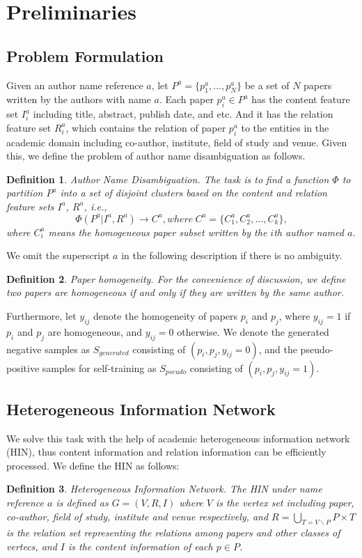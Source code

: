 \documentclass[letterpaper]{article} %
\newtheorem{mydef}{Definition}
\begin{document}
\section{Preliminaries}

\subsection{Problem Formulation}
Given an author name reference $a$, let $P^a =\{p^a_1, \dots, p^a_N\}$ be a set of $N$ papers written by the authors with name $a$.
Each paper $p_i^a \in P^a$ has the content feature set $I_i^a$ including title, abstract, publish date, and etc.
And it has the relation feature set $R_i^a$, which contains the relation of paper $p^a_i$ to the entities in the academic domain including co-author, institute, field of study and venue.
Given this, we define the problem of author name disambiguation as follows.
\begin{mydef}
Author Name Disambiguation. The task is to find a function $\Phi$ to partition $P^a$ into a set of disjoint clusters based on the content and relation feature sets $I^a$, $R^a$, i.e.,
$$\Phi(P^a|I^a, R^a) \to C^a, where \ C^a =\{C^a_1, C^a_2, \dots, C^a_k\},$$
where $C^a_i$ means the homogeneous paper subset written by the $i$th author named $a$.
\vspace*{2pt}
\end{mydef}
We omit the superscript $a$ in the following description if there is no ambiguity.
\begin{mydef}
Paper homogeneity. For the convenience of discussion, we define two papers are homogeneous if and only if they are written by the same author.
\end{mydef}
Furthermore, let $y_{ij}$ denote the homogeneity of papers $p_i$ and $p_j$, where $y_{ij}=1$ if $p_i$ and $p_j$ are homogeneous, and $y_{ij}=0$ otherwise.
We denote the generated negative samples as $S_{generated}$ consisting of $(p_i, p_j, y_{ij}=0)$, and the pseudo-positive samples for self-training as $S_{pseudo}$ consisting of $(p_i, p_j, y_{ij}=1)$.

\subsection{Heterogeneous Information Network}
We solve this task with the help of academic heterogeneous information network (HIN), thus content information and relation information can be efficiently processed.
We define the HIN as follows:
\begin{mydef}
Heterogeneous Information Network. The HIN under name reference $a$ is defined as $G = (V, R, I)$ where $V$ is the vertex set including paper, co-author, field of study, institute and venue respectively, and $R=\bigcup _{T = V \backslash P} P \times T $ is the relation set representing the relations among papers and other classes of vertecs, and $I$ is the content information of each $p\in P$.
\end{mydef}
\end{document}
